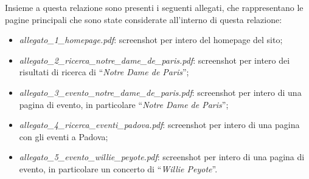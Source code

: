 	Insieme a questa relazione sono presenti i seguenti allegati, che rappresentano le pagine principali che sono state considerate all'interno di questa relazione:
	\begin{itemize}
		\item \textit{allegato\_1\_homepage.pdf}: screenshot per intero del homepage del sito;
		\item \textit{allegato\_2\_ricerca\_notre\_dame\_de\_paris.pdf}: screenshot per intero dei risultati di ricerca di ``\textit{Notre Dame de Paris}'';
		\item \textit{allegato\_3\_evento\_notre\_dame\_de\_paris.pdf}: screenshot per intero di una pagina di evento, in particolare ``\textit{Notre Dame de Paris}'';
		\item \textit{allegato\_4\_ricerca\_eventi\_padova.pdf}: screenshot per intero di una pagina con gli eventi a Padova;
		\item \textit{allegato\_5\_evento\_willie\_peyote.pdf}: screenshot per intero di una pagina di evento, in particolare un concerto di ``\textit{Willie Peyote}''.
	\end{itemize}
	
